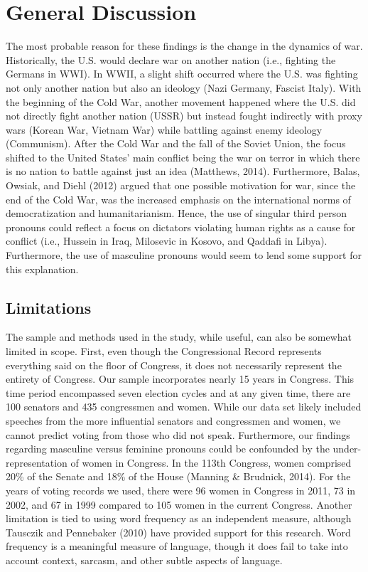 \documentclass[english,,man]{apa6}
\theoremstyle{definition}
\theoremstyle{definition}
\theoremstyle{definition}
\theoremstyle{remark}
\begin{document}
\hypertarget{general-discussion}{%
\section{General Discussion}\label{general-discussion}}

The most probable reason for these findings is the change in the
dynamics of war. Historically, the U.S. would declare war on another
nation (i.e., fighting the Germans in WWI). In WWII, a slight shift
occurred where the U.S. was fighting not only another nation but also an
ideology (Nazi Germany, Fascist Italy). With the beginning of the Cold
War, another movement happened where the U.S. did not directly fight
another nation (USSR) but instead fought indirectly with proxy wars
(Korean War, Vietnam War) while battling against enemy ideology
(Communism). After the Cold War and the fall of the Soviet Union, the
focus shifted to the United States' main conflict being the war on
terror in which there is no nation to battle against just an idea
(Matthews, 2014). Furthermore, Balas, Owsiak, and Diehl (2012) argued
that one possible motivation for war, since the end of the Cold War, was
the increased emphasis on the international norms of democratization and
humanitarianism. Hence, the use of singular third person pronouns could
reflect a focus on dictators violating human rights as a cause for
conflict (i.e., Hussein in Iraq, Milosevic in Kosovo, and Qaddafi in
Libya). Furthermore, the use of masculine pronouns would seem to lend
some support for this explanation.

\hypertarget{limitations}{%
\subsection{Limitations}\label{limitations}}

The sample and methods used in the study, while useful, can also be
somewhat limited in scope. First, even though the Congressional Record
represents everything said on the floor of Congress, it does not
necessarily represent the entirety of Congress. Our sample incorporates
nearly 15 years in Congress. This time period encompassed seven election
cycles and at any given time, there are 100 senators and 435 congressmen
and women. While our data set likely included speeches from the more
influential senators and congressmen and women, we cannot predict voting
from those who did not speak. Furthermore, our findings regarding
masculine versus feminine pronouns could be confounded by the
under-representation of women in Congress. In the 113th Congress, women
comprised 20\% of the Senate and 18\% of the House (Manning \& Brudnick,
2014). For the years of voting records we used, there were 96 women in
Congress in 2011, 73 in 2002, and 67 in 1999 compared to 105 women in
the current Congress. Another limitation is tied to using word frequency
as an independent measure, although Tausczik and Pennebaker (2010) have
provided support for this research. Word frequency is a meaningful
measure of language, though it does fail to take into account context,
sarcasm, and other subtle aspects of language.
\end{document}
